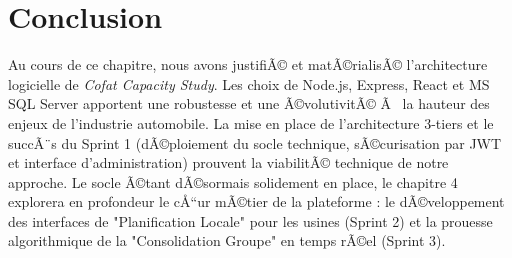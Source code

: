 \section{Conclusion}
Au cours de ce chapitre, nous avons justifiÃ© et matÃ©rialisÃ© l'architecture logicielle de \textit{Cofat Capacity Study}. Les choix de Node.js, Express, React et MS SQL Server apportent une robustesse et une Ã©volutivitÃ© Ã  la hauteur des enjeux de l'industrie automobile. La mise en place de l'architecture 3-tiers et le succÃ¨s du Sprint 1 (dÃ©ploiement du socle technique, sÃ©curisation par JWT et interface d'administration) prouvent la viabilitÃ© technique de notre approche. 
Le socle Ã©tant dÃ©sormais solidement en place, le chapitre 4 explorera en profondeur le cÅ“ur mÃ©tier de la plateforme : le dÃ©veloppement des interfaces de "Planification Locale" pour les usines (Sprint 2) et la prouesse algorithmique de la "Consolidation Groupe" en temps rÃ©el (Sprint 3).